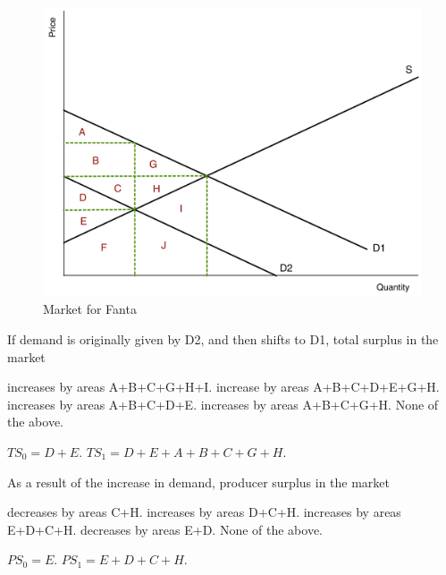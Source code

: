 \documentclass[addpoints,11pt]{exam}
\theoremstyle{definition}
\begin{document}
\begin{questions}
		
		
		\begin{figure}[H]
			\centering
			\includegraphics[scale=.45]{Exam1_MC25.pdf}
			\caption{Market for Fanta}
			\label{MC25}
		\end{figure}


		\question \label{blah9} If demand is originally given by D2, and then shifts to D1, total surplus in the market
		
		\begin{choices}
			\choice increases by areas A+B+C+G+H+I.
			\choice increase by areas A+B+C+D+E+G+H.
			\choice increases by areas A+B+C+D+E.
			\CorrectChoice increases by areas A+B+C+G+H.
			\choice None of the above.
		\end{choices}
		
		\begin{solution}
			$TS_0 = D+E.$ $TS_1 = D + E + A + B + C  + G + H$.
		\end{solution}
		
		\question \label{blah10} As a result of the increase in demand, producer surplus in the market 
			
			\begin{choices}
					\choice decreases by areas C+H.
					\CorrectChoice increases by areas D+C+H.
					\choice increases by areas E+D+C+H.
					\choice decreases by areas E+D.
					\choice None of the above.
				\end{choices}
				
		\begin{solution}
			$PS_0 = E.$ $PS_1 = E + D + C + H$.
		\end{solution}
		

\end{questions}
\end{document}
